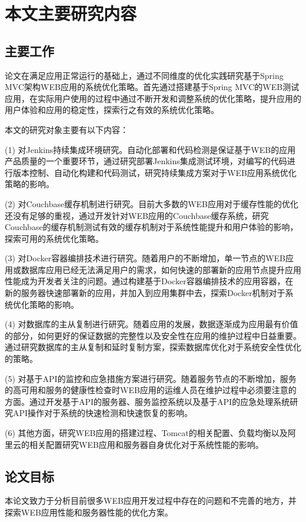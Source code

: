 \section{本文主要研究内容}
\subsection{主要工作}
论文在满足应用正常运行的基础上，通过不同维度的优化实践研究基于Spring MVC架构WEB应用的系统优化策略。首先通过搭建基于Spring MVC的WEB测试应用，在实际用户使用的过程中通过不断开发和调整系统的优化策略，提升应用的用户体验和应用的稳定性，探索行之有效的系统优化策略。

本文的研究对象主要有以下内容：

(1) 对Jenkins持续集成环境研究。自动化部署和代码检测是保证基于WEB的应用产品质量的一个重要环节，通过研究部署Jenkins集成测试环境，对编写的代码进行版本控制、自动化构建和代码测试，研究持续集成方案对于WEB应用系统优化策略的影响。

(2) 对Couchbase缓存机制进行研究。目前大多数的WEB应用对于缓存性能的优化还没有足够的重视，通过开发针对WEB应用的Couchbase缓存系统，研究Couchbase的缓存机制测试有效的缓存机制对于系统性能提升和用户体验的影响，探索可用的系统优化策略。

(3) 对Docker容器编排技术进行研究。随着用户的不断增加，单一节点的WEB应用或数据库应用已经无法满足用户的需求，如何快速的部署新的应用节点提升应用性能成为开发者关注的问题。通过构建基于Docker容器编排技术的应用容器，在新的服务器快速部署新的应用，并加入到应用集群中去，探索Docker机制对于系统优化策略的影响。

(4) 对数据库的主从复制进行研究。随着应用的发展，数据逐渐成为应用最有价值的部分，如何更好的保证数据的完整性以及安全性在应用的维护过程中日益重要。通过研究数据库的主从复制和延时复制方案，探索数据库优化对于系统安全性优化的策略。

(5) 对基于API的监控和应急措施方案进行研究。随着服务节点的不断增加，服务的高可用和服务的健康性检查时WEB应用的运维人员在维护过程中必须要注意的方面。通过开发基于API的服务器、服务监控系统以及基于API的应急处理系统研究API操作对于系统的快速检测和快速恢复的影响。

(6) 其他方面，研究WEB应用的搭建过程、Tomcat的相关配置、负载均衡以及阿里云的相关配置研究WEB应用和服务器自身优化对于系统性能的影响。

\subsection{论文目标}
本论文致力于分析目前很多WEB应用开发过程中存在的问题和不完善的地方，并探索WEB应用性能和服务器性能的优化方案。

